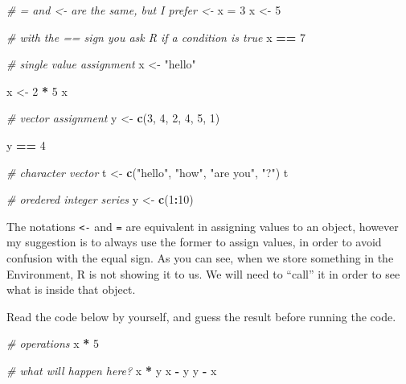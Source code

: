 \documentclass[
]{svmono}
\newenvironment{Shaded}{\begin{snugshade}}{\end{snugshade}}
\newcommand{\CommentTok}[1]{\textcolor[rgb]{0.56,0.35,0.01}{\textit{#1}}}
\newcommand{\DecValTok}[1]{\textcolor[rgb]{0.00,0.00,0.81}{#1}}
\newcommand{\FunctionTok}[1]{\textcolor[rgb]{0.13,0.29,0.53}{\textbf{#1}}}
\newcommand{\NormalTok}[1]{#1}
\newcommand{\OtherTok}[1]{\textcolor[rgb]{0.56,0.35,0.01}{#1}}
\newcommand{\SpecialCharTok}[1]{\textcolor[rgb]{0.81,0.36,0.00}{\textbf{#1}}}
\newcommand{\StringTok}[1]{\textcolor[rgb]{0.31,0.60,0.02}{#1}}
\begin{document}
\begin{Shaded}
\begin{Highlighting}[]
\CommentTok{\# = and \textless{}{-} are the same, but I prefer \textless{}{-} }
\NormalTok{x }\OtherTok{=} \DecValTok{3}
\NormalTok{x }\OtherTok{\textless{}{-}} \DecValTok{5}

\CommentTok{\# with the == sign you ask R if a condition is true}
\NormalTok{x }\SpecialCharTok{==} \DecValTok{7}

\CommentTok{\# single value assignment}
\NormalTok{x }\OtherTok{\textless{}{-}} \StringTok{"hello"}

\NormalTok{x }\OtherTok{\textless{}{-}} \DecValTok{2} \SpecialCharTok{*} \DecValTok{5}
\NormalTok{x}

\CommentTok{\# vector assignment}
\NormalTok{y }\OtherTok{\textless{}{-}} \FunctionTok{c}\NormalTok{(}\DecValTok{3}\NormalTok{, }\DecValTok{4}\NormalTok{, }\DecValTok{2}\NormalTok{, }\DecValTok{4}\NormalTok{, }\DecValTok{5}\NormalTok{, }\DecValTok{1}\NormalTok{)}

\NormalTok{y }\SpecialCharTok{==} \DecValTok{4}

\CommentTok{\# character vector}
\NormalTok{t }\OtherTok{\textless{}{-}} \FunctionTok{c}\NormalTok{(}\StringTok{"hello"}\NormalTok{, }\StringTok{"how"}\NormalTok{, }\StringTok{"are you"}\NormalTok{, }\StringTok{"?"}\NormalTok{)}
\NormalTok{t}

\CommentTok{\# oredered integer series}
\NormalTok{y }\OtherTok{\textless{}{-}} \FunctionTok{c}\NormalTok{(}\DecValTok{1}\SpecialCharTok{:}\DecValTok{10}\NormalTok{)}
\end{Highlighting}
\end{Shaded}

The notations \texttt{\textless{}-} and \texttt{=} are equivalent in assigning values to an
object, however my suggestion is to always use the former to assign
values, in order to avoid confusion with the equal sign. As you can see,
when we store something in the Environment, R is not showing it to us.
We will need to ``call'' it in order to see what is inside that object.

Read the code below by yourself, and guess the result before running the
code.

\begin{Shaded}
\begin{Highlighting}[]
\CommentTok{\# operations}
\NormalTok{x }\SpecialCharTok{*} \DecValTok{5}

\CommentTok{\# what will happen here?}
\NormalTok{x }\SpecialCharTok{*}\NormalTok{ y}
\NormalTok{x }\SpecialCharTok{{-}}\NormalTok{ y}
\NormalTok{y }\SpecialCharTok{{-}}\NormalTok{ x}
\end{Highlighting}
\end{Shaded}
\end{document}
